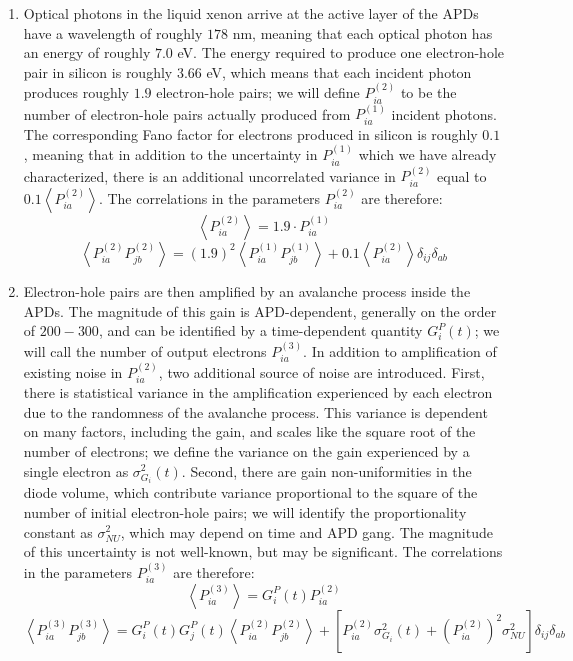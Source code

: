 \begin{enumerate}
\item Optical photons in the liquid xenon arrive at the active layer of the APDs have a wavelength of roughly $178$ nm, meaning that each optical photon has an energy of roughly $7.0$ eV.  The energy required to produce one electron-hole pair in silicon is roughly $3.66$ eV, which means that each incident photon produces roughly $1.9$ electron-hole pairs; we will define $P^{(2)}_{ia}$ to be the number of electron-hole pairs actually produced from $P^{(1)}_{ia}$ incident photons.  The corresponding Fano factor for electrons produced in silicon is roughly $0.1$, meaning that in addition to the uncertainty in $P^{(1)}_{ia}$ which we have already characterized, there is an additional uncorrelated variance in $P^{(2)}_{ia}$ equal to $0.1 \left<P^{(2)}_{ia}\right>$.  The correlations in the parameters $P^{(2)}_{ia}$ are therefore:
\[\left< P^{(2)}_{ia} \right> = 1.9 \cdot P^{(1)}_{ia}\]
\[\left< P^{(2)}_{ia} P^{(2)}_{jb} \right> = (1.9)^2\left< P^{(1)}_{ia} P^{(1)}_{jb} \right> + 0.1 \left< P^{(2)}_{ia}\right> \delta_{ij}\delta_{ab}\]
\item Electron-hole pairs are then amplified by an avalanche process inside the APDs.  The magnitude of this gain is APD-dependent, generally on the order of $200-300$, and can be identified by a time-dependent quantity $G^P_i(t)$; we will call the number of output electrons $P^{(3)}_{ia}$.  In addition to amplification of existing noise in $P^{(2)}_{ia}$, two additional source of noise are introduced.  First, there is statistical variance in the amplification experienced by each electron due to the randomness of the avalanche process.  This variance is dependent on many factors, including the gain, and scales like the square root of the number of electrons; we define the variance on the gain experienced by a single electron as $\sigma^2_{G_i}(t)$.  Second, there are gain non-uniformities in the diode volume, which contribute variance proportional to the square of the number of initial electron-hole pairs; we will identify the proportionality constant as $\sigma^2_{NU}$, which may depend on time and APD gang.  The magnitude of this uncertainty is not well-known, but may be significant.  The correlations in the parameters $P^{(3)}_{ia}$ are therefore:
\[\left< P^{(3)}_{ia} \right> = G^P_i(t)P^{(2)}_{ia}\]
\[\left< P^{(3)}_{ia} P^{(3)}_{jb} \right> = G^P_i(t)G^P_j(t) \left< P^{(2)}_{ia} P^{(2)}_{jb} \right> + \left[P^{(2)}_{ia}\sigma^2_{G_i}(t) + \left(P^{(2)}_{ia}\right)^2\sigma^2_{NU}\right]\delta_{ij}\delta_{ab}\]
\end{enumerate}

